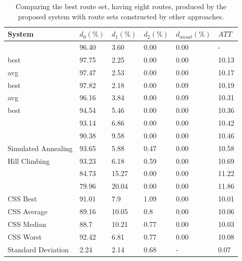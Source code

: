     \begin{table}[H]
    \centering
    \hspace*{-1.0cm}
    \begin{tabular}{|l|l|l|l|l|l|}
    \hline
    \textbf{System} & $d_0(\%)$ & $d_1(\%)$ & $d_2(\%)$ & $d_{unsat}(\%)$ & $ATT$ \\
    \hline
    \citet{nikolic14} & 96.40 & 3.60 & 0.00 & 0.00 & - \\
    \citet{kechagiopoulos14} best & 97.75 & 2.25 & 0.00 & 0.00 & 10.13 \\
    \citet{kechagiopoulos14} avg & 97.47 & 2.53 & 0.00 & 0.00 & 10.17 \\
    \citet{chew12} best & 97.82 & 2.18 & 0.00 & 0.09 & 10.19 \\
    \citet{chew12} avg & 96.16 & 3.84 & 0.00 & 0.09 & 10.31 \\
    \citet{fan10} best & 94.54 & 5.46 & 0.00 & 0.00 & 10.36 \\
    \citet{zhang10} & 93.14 & 6.86 & 0.00 & 0.00 & 10.42 \\
    \citet{chakroborty02} & 90.38 & 9.58 & 0.00 & 0.00 & 10.46 \\
    \citet{fan10} Simulated Annealing & 93.65 & 5.88 & 0.47 & 0.00 & 10.58 \\
    \citet{fan10} Hill Climbing & 93.23 & 6.18 & 0.59 & 0.00 & 10.69 \\
    \citet{kidwai98} & 84.73 & 15.27 & 0.00 & 0.00 & 11.22 \\
    \citet{baaj91} & 79.96 & 20.04 & 0.00 & 0.00 & 11.86 \\ 
    \hline
    CSS Best & 91.01 & 7.9 & 1.09 & 0.00 & 10.01\\
    CSS Average & 89.16 & 10.05 & 0.8 & 0.00 & 10.06\\
    CSS Median & 88.7 & 10.21 & 0.77 & 0.00 & 10.03\\
    CSS Worst & 92.42 & 6.81 & 0.77 & 0.00 & 10.08\\
    Standard Deviation & 2.24 & 2.14 & 0.68 & - & 0.07\\
    \hline
    \end{tabular}
    \caption {Comparing the best route set, having eight routes, produced by the proposed system with route sets constructed by other approaches.}
    \label{table:performanceComparison_8}
    \end{table}





